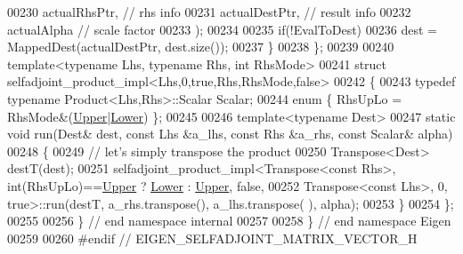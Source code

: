 \begin{DoxyCode}
00230         actualRhsPtr,                           \textcolor{comment}{// rhs info}
00231         actualDestPtr,                          \textcolor{comment}{// result info}
00232         actualAlpha                             \textcolor{comment}{// scale factor}
00233       );
00234     
00235     \textcolor{keywordflow}{if}(!EvalToDest)
00236       dest = MappedDest(actualDestPtr, dest.size());
00237   \}
00238 \};
00239 
00240 \textcolor{keyword}{template}<\textcolor{keyword}{typename} Lhs, \textcolor{keyword}{typename} Rhs, \textcolor{keywordtype}{int} RhsMode>
00241 \textcolor{keyword}{struct }selfadjoint\_product\_impl<Lhs,0,true,Rhs,RhsMode,false>
00242 \{
00243   \textcolor{keyword}{typedef} \textcolor{keyword}{typename} Product<Lhs,Rhs>::Scalar Scalar;
00244   \textcolor{keyword}{enum} \{ RhsUpLo = RhsMode&(\hyperlink{group__enums_gga39e3366ff5554d731e7dc8bb642f83cda6bcb58be3b8b8ec84859ce0c5ac0aaec}{Upper}|\hyperlink{group__enums_gga39e3366ff5554d731e7dc8bb642f83cda891792b8ed394f7607ab16dd716f60e6}{Lower})  \};
00245 
00246   \textcolor{keyword}{template}<\textcolor{keyword}{typename} Dest>
00247   \textcolor{keyword}{static} \textcolor{keywordtype}{void} run(Dest& dest, \textcolor{keyword}{const} Lhs &a\_lhs, \textcolor{keyword}{const} Rhs &a\_rhs, \textcolor{keyword}{const} Scalar& alpha)
00248   \{
00249     \textcolor{comment}{// let's simply transpose the product}
00250     Transpose<Dest> destT(dest);
00251     selfadjoint\_product\_impl<Transpose<const Rhs>, int(RhsUpLo)==\hyperlink{group__enums_gga39e3366ff5554d731e7dc8bb642f83cda6bcb58be3b8b8ec84859ce0c5ac0aaec}{Upper} ? 
      \hyperlink{group__enums_gga39e3366ff5554d731e7dc8bb642f83cda891792b8ed394f7607ab16dd716f60e6}{Lower} : \hyperlink{group__enums_gga39e3366ff5554d731e7dc8bb642f83cda6bcb58be3b8b8ec84859ce0c5ac0aaec}{Upper}, \textcolor{keyword}{false},
00252                              Transpose<const Lhs>, 0, \textcolor{keyword}{true}>::run(destT, a\_rhs.transpose(), a\_lhs.transpose(
      ), alpha);
00253   \}
00254 \};
00255 
00256 \} \textcolor{comment}{// end namespace internal}
00257 
00258 \} \textcolor{comment}{// end namespace Eigen}
00259 
00260 \textcolor{preprocessor}{#endif // EIGEN\_SELFADJOINT\_MATRIX\_VECTOR\_H}
\end{DoxyCode}
